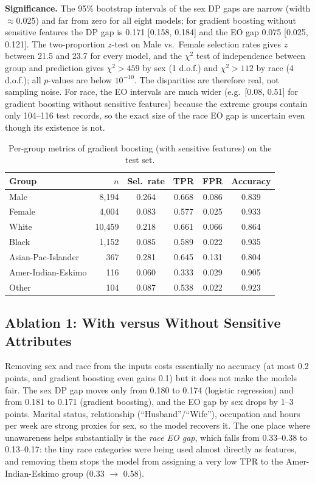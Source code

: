 \documentclass[conference]{IEEEtran}
\begin{document}
\textbf{Significance.} The 95\% bootstrap intervals of the sex DP gaps are narrow (width $\approx$0.025) and far from zero for all eight models; for gradient boosting without sensitive features the DP gap is 0.171 [0.158, 0.184] and the EO gap 0.075 [0.025, 0.121]. The two-proportion $z$-test on Male vs.\ Female selection rates gives $z$ between 21.5 and 23.7 for every model, and the $\chi^2$ test of independence between group and prediction gives $\chi^2>459$ by sex (1 d.o.f.) and $\chi^2>112$ by race (4 d.o.f.); all $p$-values are below $10^{-10}$. The disparities are therefore real, not sampling noise. For race, the EO intervals are much wider (e.g.\ [0.08, 0.51] for gradient boosting without sensitive features) because the extreme groups contain only 104--116 test records, so the exact size of the race EO gap is uncertain even though its existence is not.

\begin{table}[t]
\caption{Per-group metrics of gradient boosting (with sensitive features) on the test set.}
\label{tab:groups}
\centering\scriptsize
\begin{tabular}{lrcccc}
\toprule
Group & $n$ & Sel.\ rate & TPR & FPR & Accuracy \\
\midrule
Male & 8{,}194 & 0.264 & 0.668 & 0.086 & 0.839 \\
Female & 4{,}004 & 0.083 & 0.577 & 0.025 & 0.933 \\
\midrule
White & 10{,}459 & 0.218 & 0.661 & 0.066 & 0.864 \\
Black & 1{,}152 & 0.085 & 0.589 & 0.022 & 0.935 \\
Asian-Pac-Islander & 367 & 0.281 & 0.645 & 0.131 & 0.804 \\
Amer-Indian-Eskimo & 116 & 0.060 & 0.333 & 0.029 & 0.905 \\
Other & 104 & 0.087 & 0.538 & 0.022 & 0.923 \\
\bottomrule
\end{tabular}
\end{table}

\subsection{Ablation 1: With versus Without Sensitive Attributes}
Removing sex and race from the inputs costs essentially no accuracy (at most 0.2 points, and gradient boosting even gains 0.1) but it does not make the models fair. The sex DP gap moves only from 0.180 to 0.174 (logistic regression) and from 0.181 to 0.171 (gradient boosting), and the EO gap by sex drops by 1--3 points. Marital status, relationship (``Husband''/``Wife''), occupation and hours per week are strong proxies for sex, so the model recovers it. The one place where unawareness helps substantially is the \emph{race EO gap}, which falls from 0.33--0.38 to 0.13--0.17: the tiny race categories were being used almost directly as features, and removing them stops the model from assigning a very low TPR to the Amer-Indian-Eskimo group (0.33 $\rightarrow$ 0.58).
\end{document}
